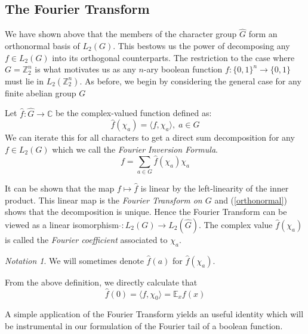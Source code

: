 \documentclass{amsart}
\theoremstyle{definition}
\theoremstyle{remark}
\numberwithin{equation}{section}
\theoremstyle{remark}
\newtheorem{notation}[theorem]{Notation}
\begin{document}
\subsection{The Fourier Transform}

We have shown above that the members of the character group $\hat{G}$ form an orthonormal basis of $L_2(G)$. This bestows us the power of decomposing any $f \in L_2(G)$ into its orthogonal counterparts. The restriction to the case where $G = \mathbb{Z}_2^n$ is what motivates us as any $n$-ary boolean function $f: \{0,1\}^n \rightarrow \{0,1\}$ must lie in $L_2(\mathbb{Z}_2^n)$. As before, we begin by considering the general case for any finite abelian group $G$  \newline

Let $\hat{f}: \hat{G} \rightarrow \mathbb{C}$ be the complex-valued function defined as:
%
\begin{equation}
  \hat{f}(\chi_a) =  \langle f, \chi_a \rangle, \; a \in G
\end{equation}
%
We can iterate this for all characters to get a direct sum decomposition for any $f \in L_2(G)$ which we call the \emph{Fourier Inversion Formula}\newline.
%
\begin{equation}
  f = \sum_{a \in G} \hat{f}(\chi_a)\chi_a
\end{equation}

It can be shown that the map $f \mapsto \hat{f}$ is linear by the left-linearity of the inner product. This linear map is the \emph{Fourier Transform on $G$} and (\ref{orthonormal}) shows that the decomposition is unique. Hence the Fourier Transform can be viewed as a linear isomorphism $\hat{}:L_2(G) \rightarrow L_2(\hat{G})$. The complex value $\hat{f}(\chi_a)$ is called the \emph{Fourier coefficient} associated to $\chi_a$.
%
\begin{notation}
  We will sometimes denote $\hat{f}(a)$ for $\hat{f}(\chi_a)$.
\end{notation}
%
From the above definition, we directly calculate that
\begin{equation}
  \hat{f}(0) = \langle f, \chi_0 \rangle = \mathbb{E}_x f(x)
\end{equation}

A simple application of the Fourier Transform yields an useful identity which will be instrumental in our formulation of the Fourier tail of a boolean function.
\end{document}

